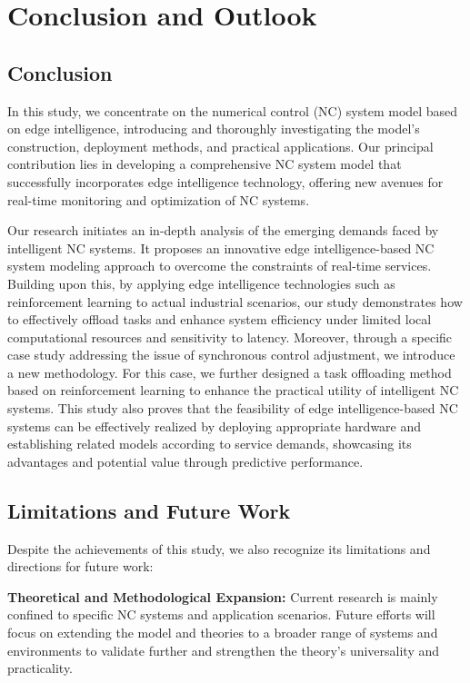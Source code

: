 \documentclass[preprint,12pt]{elsarticle}
\begin{document}
\section{Conclusion and Outlook}





\subsection{Conclusion}

In this study, we concentrate on the numerical control (NC) system model based on edge intelligence, introducing and thoroughly investigating the model's construction, deployment methods, and practical applications. Our principal contribution lies in developing a comprehensive NC system model that successfully incorporates edge intelligence technology, offering new avenues for real-time monitoring and optimization of NC systems.

Our research initiates an in-depth analysis of the emerging demands faced by intelligent NC systems. It proposes an innovative edge intelligence-based NC system modeling approach to overcome the constraints of real-time services. Building upon this, by applying edge intelligence technologies such as reinforcement learning to actual industrial scenarios, our study demonstrates how to effectively offload tasks and enhance system efficiency under limited local computational resources and sensitivity to latency. Moreover, through a specific case study addressing the issue of synchronous control adjustment, we introduce a new methodology. For this case, we further designed a task offloading method based on reinforcement learning to enhance the practical utility of intelligent NC systems. This study also proves that the feasibility of edge intelligence-based NC systems can be effectively realized by deploying appropriate hardware and establishing related models according to service demands, showcasing its advantages and potential value through predictive performance.

\subsection{Limitations and Future Work}

Despite the achievements of this study, we also recognize its limitations and directions for future work:

\textbf{Theoretical and Methodological Expansion:} Current research is mainly confined to specific NC systems and application scenarios. Future efforts will focus on extending the model and theories to a broader range of systems and environments to validate further and strengthen the theory's universality and practicality.
\end{document}
